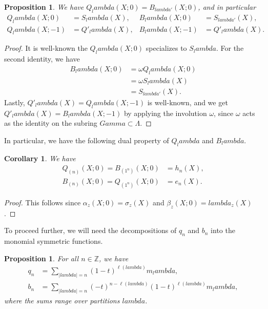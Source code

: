 \documentclass[12pt]{amsart}%
\def\Gamma{Gamma}%
\def\lambda{lambda}%
\newtheorem{corollary}[theorem]{Corollary}
\newtheorem{proposition}[theorem]{Proposition}
\theoremstyle{remark}
\theoremstyle{definition}
\newcommand{\Z}{\mathbb{Z}}
\begin{document}
    \begin{proposition}
        We have $Q_\lambda(X;0)=B_{\lambda'}(X;0)$, and in particular
        \begin{align*}
            Q_\lambda(X;0)&=S_\lambda(X),&
            B_\lambda(X;0)&=S_{\lambda'}(X),\\
            Q_\lambda(X;-1)&=Q'_\lambda(X),&
            B_\lambda(X;-1)&=Q'_\lambda(X).
        \end{align*}
    \end{proposition}
    
    \begin{proof}
        It is well-known the $Q_\lambda(X;0)$ specializes to $S_\lambda$. For the second identity, we have
        \begin{align*}
            B_\lambda(X;0)&=\omega Q_\lambda(X;0)\\
            &=\omega S_\lambda(X)\\
            &=S_{\lambda'}(X).
        \end{align*}
        Lastly, $Q'_\lambda(X)=Q_\lambda(X;-1)$ is well-known, and we get $Q'_\lambda(X)=B_\lambda(X;-1)$ by applying the involution $\omega$, since $\omega$ acts as the identity on the subring $\Gamma\subset\Lambda$.
    \end{proof}

    In particular, we have the following dual property of $Q_\lambda$ and $B_\lambda$.

    \begin{corollary}
        We have
        \begin{align*}
            Q_{(n)}(X;0)=B_{(1^n)}(X;0)&=h_n(X),\\
            B_{(n)}(X;0)=Q_{(1^n)}(X;0)&=e_n(X).
        \end{align*}
    \end{corollary}
    
    \begin{proof}
        This follows since $\alpha_z(X;0)=\sigma_z(X)$ and $\beta_z(X;0)=\lambda_z(X)$.
    \end{proof}

    To proceed further, we will need the decompositions of $q_n$ and $b_n$ into the monomial symmetric functions.

    \begin{proposition}\label{b_n monomials}
        For all $n\in\Z$, we have
        \begin{align}
            q_n&=\sum_{|\lambda|=n}(1-t)^{\ell(\lambda)}m_\lambda,\\
            b_n&=\sum_{|\lambda|=n}(-t)^{n-\ell(\lambda)}(1-t)^{\ell(\lambda)}m_\lambda,
        \end{align}
        where the sums range over partitions $\lambda$.
    \end{proposition}
\end{document}
